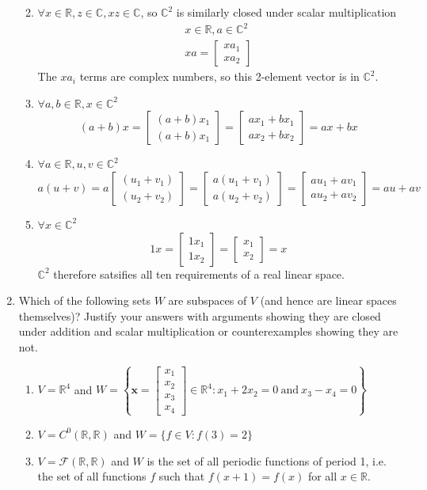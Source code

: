 \documentclass[]{article}
\newcommand{\R}{\mathbb{R}}
\newcommand{\C}{\mathbb{C}}
\newcommand{\bbm}{\begin{bmatrix}}
\newcommand{\ebm}{\end{bmatrix}}
\newcommand{\x}{\bm{x}}
\begin{document}
\begin{enumerate}[resume]
\begin{enumerate}
\[        \]
      \item $\forall x \in \R, z \in \C, xz \in \C$, so $\C^2$ is similarly
        closed under scalar multiplication
        \begin{gather}
          x \in \R, a \in \C^2 \\
          x a = \bbm x a_1 \\ x a_2 \ebm
        \end{gather}
        The $x a_i$ terms are complex numbers, so this 2-element vector is in $\C^2$.
      \item $\forall a,b \in \R, x \in \C^2$
        \[
        (a + b)x = \bbm (a + b)x_1 \\ (a + b)x_1 \ebm  = \bbm a x_1 + b x_1 \\ ax_2 + bx_2 \ebm = ax + b x
        \]
      \item $\forall a \in \R, u,v \in \C^2$
        \[
        a ( u + v ) = a \bbm (u_1 + v_1) \\ (u_2 + v_2) \ebm = \bbm a (u_1 + v_1) \\ a (u_2 + v_2) \ebm = \bbm au_1 + av_1 \\ au_2 + av_2 \ebm = au + av
        \]
      \item $\forall x \in \C^2$
        \[
        1 x = \bbm 1 x_1 \\ 1 x_2 \ebm = \bbm x_1 \\ x_2 \ebm = x
        \]
        $\C^2$ therefore satsifies all ten requirements of a real linear space.
      \end{enumerate}
      
	\item Which of the following sets $W$ are subspaces of $V$ (and hence are linear spaces themselves)? Justify your answers with arguments showing they are closed under addition and scalar multiplication or counterexamples showing they are not.
	  \begin{enumerate}
	  \item $V = \R^4$ and $W = \left\{ \x=\bbm x_1\\x_2\\x_3\\x_4 \ebm\in\R^4: x_1+2x_2 = 0 ~\mathrm{and}~ x_3-x_4=0 \right\}$
	  \item $V=C^0(\R,\R)$ and $W = \{ f\in V : f(3) = 2\}$
	  \item $V = \mathcal{F}(\R,\R)$ and $W$ is the set of all periodic functions of period 1, i.e. the set of all functions $f$ such that $f(x+1)=f(x)$ for all $x\in\R$.
	  \end{enumerate}


\end{enumerate}
\end{document}
